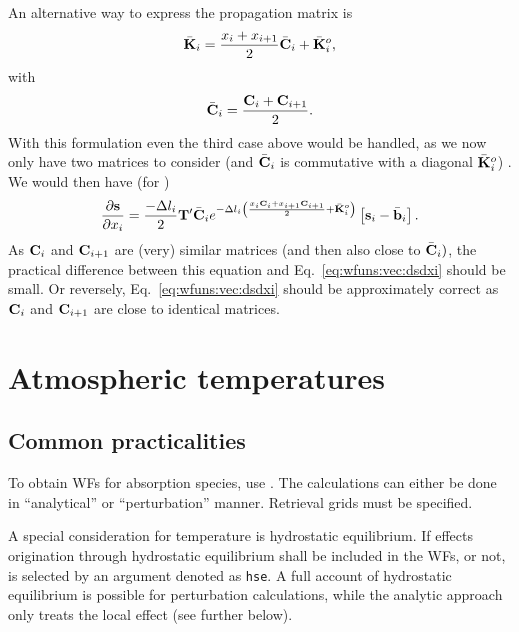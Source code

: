 An alternative way to express the propagation matrix is
\begin{displaymath}
  \bar{{\bf K}}_i = \frac{x_{i}+x_{i+1}}{2}\bar{\mathbf{C}}_i + 
   \bar{{\bf K}}_i^o,   
\end{displaymath}
with
\begin{displaymath}
  \bar{\mathbf{C}}_i = \frac{\mathbf{C}_i+\mathbf{C}_{i+1}}{2}.   
\end{displaymath}
With this formulation even the third case above would be handled, as we now
only have two matrices to consider (and $\bar{\mathbf{C}}_i$ is commutative
with a diagonal $\bar{{\bf K}}_i^o$) . We would then have (for )
\begin{displaymath}
  \frac{\partial{\bf s}}{\partial x_{i}} =  
  \frac{-\Delta l_{i}}{2} \mathbf{T}' \bar{\mathbf{C}}_i
  e^{-\Delta l_{i}\left(\frac{x_{i}\mathbf{C}_i+
            x_{i+1}\mathbf{C}_{i+1}}{2} + \bar{{\bf K}}_i^o \right)}
   \left[ {\bf s}_{i}-\bar{{\bf b}}_i\right]. \nonumber    
\end{displaymath}
As $\mathbf{C}_i$ and $\mathbf{C}_{i+1}$ are (very) similar matrices (and then
also close to $\bar{\mathbf{C}}_i)$, the practical difference between this
equation and Eq.~\ref{eq:wfuns:vec:dsdxi} should be small. Or reversely,
Eq.~\ref{eq:wfuns:vec:dsdxi} should be approximately correct as $\mathbf{C}_i$
and $\mathbf{C}_{i+1}$ are close to identical matrices.







\section{Atmospheric temperatures}
\label{sec:wfuns:atmtemp}

\subsection{Common practicalities}
%
To obtain WFs for absorption species, use .
The calculations can either be done in ``analytical'' or ``perturbation''
manner. Retrieval grids must be specified.

A special consideration for temperature is hydrostatic equilibrium. If effects
origination through hydrostatic equilibrium shall be included in the WFs, or
not, is selected by an argument denoted as \verb|hse|. A full account of
hydrostatic equilibrium is possible for perturbation calculations, while the
analytic approach only treats the local effect (see further below).


